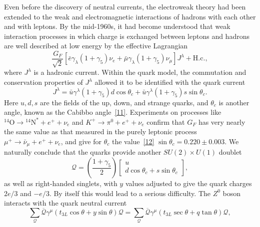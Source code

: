 Even before the discovery of neutral currents, the electroweak theory had been extended to the weak and electromagnetic interactions of hadrons with each other and with leptons. By the mid-1960s, it had become understood that weak interaction processes in which charge is exchanged between leptons and hadrons are well described at low energy by the effective Lagrangian
\begin{equation}
\frac{G_F}{\sqrt{2}}
\left[
\bar e\gamma_\lambda(1+\gamma_5)\nu_e
+\bar\mu\gamma_\lambda(1+\gamma_5)\nu_\mu
\right]J^\lambda+\mathrm{H.c.},
\tag{21.3.39}\label{eq:21.3.39}
\end{equation}
where $J^\lambda$ is a hadronic current. Within the quark model, the commutation and conservation properties of $J^\lambda$ allowed it to be identified with the quark current
\begin{equation}
J^\lambda
=\bar u\gamma^\lambda(1+\gamma_5)d\cos\theta_c
+\bar u\gamma^\lambda(1+\gamma_5)s\sin\theta_c.
\tag{21.3.40}\label{eq:21.3.40}
\end{equation}
Here $u,d,s$ are the fields of the up, down, and strange quarks, and $\theta_c$ is another angle, known as the Cabibbo angle~\hyperref[ch21-ref-11]{[11]}. Experiments on processes like ${}^{14}\mathrm O\to{}^{14}\mathrm N^*+e^++\nu_e$ and $K^+\to\pi^0+e^++\nu_e$ confirm that $G_F$ has very nearly the same value as that measured in the purely leptonic process $\mu^+\to\bar\nu_\mu+e^++\nu_e$, and give for $\theta_c$ the value~\hyperref[ch21-ref-12]{[12]} $\sin\theta_c=0.220\mathbin{\pm}0.003$. We naturally conclude that the quarks provide another $SU(2)\times U(1)$ doublet
\begin{equation}
\mathcal{Q}
=\left(\frac{1+\gamma_5}{2}\right)
\begin{bmatrix}
u\\
d\cos\theta_c+s\sin\theta_c
\end{bmatrix},
\tag{21.3.41}\label{eq:21.3.41}
\end{equation}
as well as right-handed singlets, with $y$ values adjusted to give the quark charges $2e/3$ and $-e/3$. By itself this would lead to a serious difficulty. The $Z^0$ boson interacts with the quark neutral current
\begin{equation}
\sum_{\mathcal Q}
\overline{\mathcal Q}\gamma^\mu
(t_{3L}\cos\theta+y\sin\theta)\mathcal Q
=
\sum_{\mathcal Q}
\overline{\mathcal Q}\gamma^\mu
(t_{3L}\sec\theta+q\tan\theta)\mathcal Q,
\tag{21.3.42}\label{eq:21.3.42}
\end{equation}
